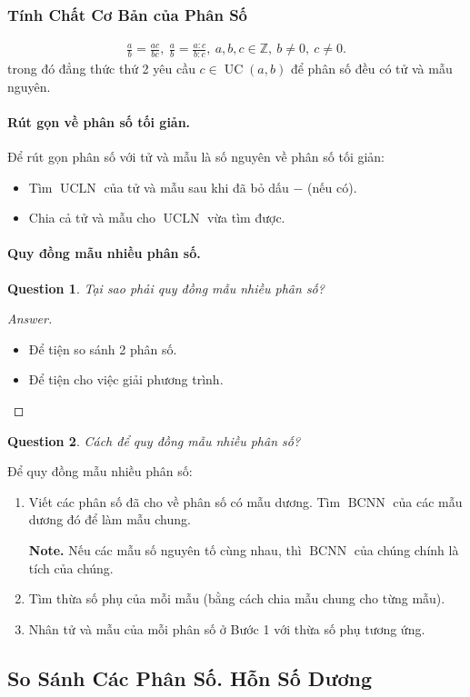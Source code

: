 \documentclass{article}
\numberwithin{equation}{section}
\newtheorem{ques}{Question}[section]
\begin{document}
\subsubsection{Tính Chất Cơ Bản của Phân Số}
\begin{align}
	\boxed{\frac{a}{b} = \frac{ac}{bc},\ \frac{a}{b} = \frac{a:c}{b:c},\ a,b,c\in\mathbb{Z},\ b\ne 0,\ c\ne 0.}
\end{align}
trong đó đẳng thức thứ 2 yêu cầu $c\in\operatorname{UC}(a,b)$ để phân số đều có tử và mẫu nguyên.

\paragraph{Rút gọn về phân số tối giản.}
Để rút gọn phân số với tử và mẫu là số nguyên về phân số tối giản:
\begin{itemize}
	\item Tìm $\operatorname{UCLN}$ của tử và mẫu sau khi đã bỏ dấu $-$ (nếu có).
	\item Chia cả tử và mẫu cho $\operatorname{UCLN}$ vừa tìm được.
\end{itemize}

\paragraph{Quy đồng mẫu nhiều phân số.}
\begin{ques}
	Tại sao phải quy đồng mẫu nhiều phân số?
\end{ques}

\begin{proof}[Answer]
	\begin{itemize}
		\item Để tiện so sánh 2 phân số.
		\item Để tiện cho việc giải phương trình.
	\end{itemize}
\end{proof}

\begin{ques}
	Cách để quy đồng mẫu nhiều phân số?
\end{ques}
Để quy đồng mẫu nhiều phân số:
\begin{enumerate}
	\item Viết các phân số đã cho về phân số có mẫu dương. Tìm $\operatorname{BCNN}$ của các mẫu dương đó để làm mẫu chung.
	
	\textbf{Note.} Nếu các mẫu số nguyên tố cùng nhau, thì $\operatorname{BCNN}$ của chúng chính là tích của chúng.
	\item Tìm thừa số phụ của mỗi mẫu (bằng cách chia mẫu chung cho từng mẫu).
	\item Nhân tử và mẫu của mỗi phân số ở Bước 1 với thừa số phụ tương ứng.
\end{enumerate}

\subsection{So Sánh Các Phân Số. Hỗn Số Dương}




\begin{thebibliography}{99}
	\bibitem[]{}
\end{thebibliography}

\printbibliography[heading=bibintoc]

	
\end{document}
